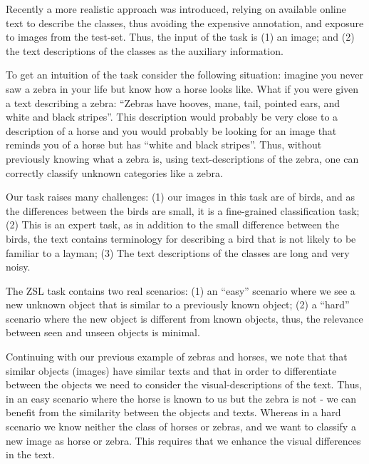 \documentclass[11pt,a4paper]{article}
\begin{document}




Recently a more realistic approach was introduced, relying on available online text to describe the classes, thus avoiding the expensive annotation, and exposure to images from the test-set.
Thus, the input of the task is (1) an image; and (2) the text descriptions of the classes as the auxiliary information. \par

To get an intuition of the task consider the following situation:
imagine you never saw a zebra in your life but know how a horse looks like. What if you were given a text describing a zebra: \enquote{Zebras have hooves, mane, tail, pointed ears, and white and black stripes}. This description would probably be very close to a description of a horse and you would probably be looking for an image that reminds you of a horse but has \enquote{white and black stripes}. Thus, without previously knowing what a zebra is, using text-descriptions of the zebra, one can correctly classify unknown categories like a zebra.

Our task raises many challenges: (1) our images in this task are of birds, and as the differences between the birds are small, it is a fine-grained classification task; (2) This is an expert task, as in addition to the small difference between the birds, the text contains terminology for describing a bird that is not likely to be familiar to a layman;
(3) The text descriptions of the classes are long and very noisy. \par 


The ZSL task contains two real scenarios: (1) an \enquote{easy} scenario where we see a new unknown object that is similar to a previously known object; (2) a \enquote{hard} scenario where the new object is different from known objects, thus, the relevance between seen and unseen objects is minimal.\par

Continuing with our previous example of zebras and horses, we note that that similar objects (images) have similar texts and that in order to differentiate between the objects we need to consider the visual-descriptions of the text.  Thus, in an easy scenario where the horse is known to us but the zebra is not - we can benefit from the similarity between the objects and texts. Whereas in a hard scenario we know neither the class of horses or zebras, and we want to classify a new image as horse or zebra. This requires that we enhance the visual differences in the text.\par
\end{document}
